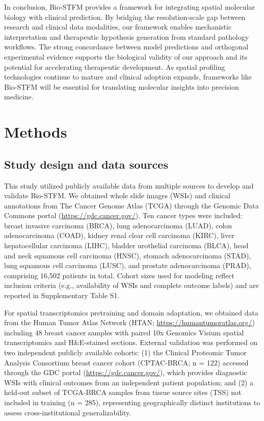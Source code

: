 \documentclass[pdflatex,sn-nature]{sn-jnl}%
\theoremstyle{thmstyleone}%
\theoremstyle{thmstyletwo}%
\theoremstyle{thmstylethree}%
\begin{document}
In conclusion, Bio-STFM provides a framework for integrating spatial molecular biology with clinical prediction. By bridging the resolution-scale gap between research and clinical data modalities, our framework enables mechanistic interpretation and therapeutic hypothesis generation from standard pathology workflows. The strong concordance between model predictions and orthogonal experimental evidence supports the biological validity of our approach and its potential for accelerating therapeutic development. As spatial profiling technologies continue to mature and clinical adoption expands, frameworks like Bio-STFM will be essential for translating molecular insights into precision medicine.

\section{Methods}\label{sec11}

\subsection{Study design and data sources}

This study utilized publicly available data from multiple sources to develop and validate Bio-STFM. We obtained whole slide images (WSIs) and clinical annotations from The Cancer Genome Atlas (TCGA) through the Genomic Data Commons portal (\url{https://gdc.cancer.gov/}). Ten cancer types were included: breast invasive carcinoma (BRCA), lung adenocarcinoma (LUAD), colon adenocarcinoma (COAD), kidney renal clear cell carcinoma (KIRC), liver hepatocellular carcinoma (LIHC), bladder urothelial carcinoma (BLCA), head and neck squamous cell carcinoma (HNSC), stomach adenocarcinoma (STAD), lung squamous cell carcinoma (LUSC), and prostate adenocarcinoma (PRAD), comprising 16,502 patients in total. Cohort sizes used for modeling reflect inclusion criteria (e.g., availability of WSIs and complete outcome labels) and are reported in Supplementary Table S1.

For spatial transcriptomics pretraining and domain adaptation, we obtained data from the Human Tumor Atlas Network (HTAN; \url{https://humantumoratlas.org/}) including 48 breast cancer samples with paired 10x Genomics Visium spatial transcriptomics and H\&E-stained sections. External validation was performed on two independent publicly available cohorts: (1) the Clinical Proteomic Tumor Analysis Consortium breast cancer cohort (CPTAC-BRCA; n = 122) accessed through the GDC portal (\url{https://gdc.cancer.gov/}), which provides diagnostic WSIs with clinical outcomes from an independent patient population; and (2) a held-out subset of TCGA-BRCA samples from tissue source sites (TSS) not included in training (n = 285), representing geographically distinct institutions to assess cross-institutional generalizability.
\end{document}
